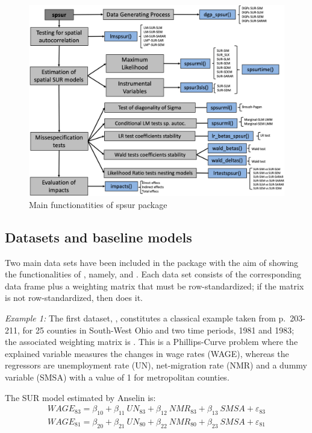 \documentclass[article]{jss}
\begin{document}
\begin{CodeChunk}
\begin{figure}[h]

{\centering \includegraphics[width=0.75\linewidth]{Figure1_JSS2} 

}

\caption[\label{Fig1} Main functionatities of spsur package]{\label{Fig1} Main functionatities of spsur package}\label{fig:Figure1}
\end{figure}
\end{CodeChunk}

\hypertarget{Datasets-and-baseline-models}{%
\subsection{Datasets and baseline models}\label{Datasets-and-baseline-models}}

Two main data sets have been included in the package with the aim of showing the functionalities of ,
namely,  and . Each data set consists of the corresponding data frame plus a weighting matrix that must be row-standardized; if the matrix is not row-standardized, then  does it.

\emph{Example 1:} The first dataset, , constitutes a classical example taken from \citet{Anselin1988a} p.~203-211, for 25 counties in South-West Ohio and two time periods, 1981 and 1983; the associated weighting matrix is . This is a Phillips-Curve problem where the explained variable measures the changes in wage rates (WAGE), whereas the regressors are unemployment rate (UN), net-migration rate (NMR) and a dummy variable (SMSA) with a value of 1 for metropolitan counties.

The SUR model estimated by Anselin is:
\begin{equation}
\begin{array}{ll}
WAGE_{83} = \beta_{10} + \beta_{11} \ UN_{83} + \beta_{12} \  NMR_{83} + \beta_{13} \ SMSA + \varepsilon_{83} \\
WAGE_{81} = \beta_{20} + \beta_{21} \ UN_{80} + \beta_{22} \ NMR_{80} + \beta_{23} \ SMSA+ \varepsilon_{81}
\end{array}
\label{eq:Anselin0}
\end{equation}
\end{document}
